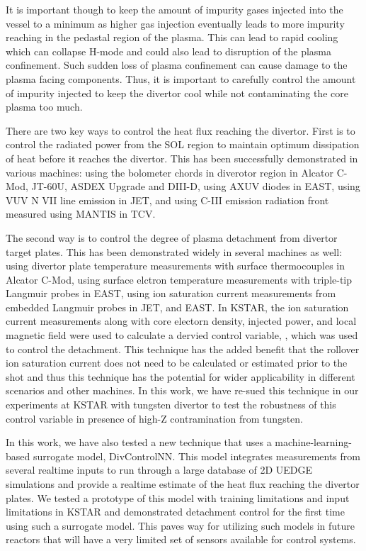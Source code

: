It is important though to keep the amount of impurity gases injected into the vessel to a minimum as higher gas injection eventually leads to more impurity reaching in the pedastal region of the plasma.
This can lead to rapid cooling which can collapse H-mode and could also lead to disruption of the plasma confinement.
Such sudden loss of plasma confinement can cause damage to the plasma facing components.
Thus, it is important to carefully control the amount of impurity injected to keep the divertor cool while not contaminating the core plasma too much.

There are two key ways to control the heat flux reaching the divertor.
First is to control the radiated power from the \ac{SOL} region to maintain optimum dissipation of heat before it reaches the divertor.
This has been successfully demonstrated in various machines:
using the bolometer chords in diverotor region in Alcator C-Mod\cite{Goetz_1999_POP}, JT-60U\cite{Asakura_2009_NF}, ASDEX Upgrade\cite{Kallenbach_2012_NF} and DIII-D\cite{Eldon_2019_NME},
using AXUV diodes in EAST\cite{Wu_2018_NF},
using VUV N VII line emission in JET\cite{Maddison_2011_NF}, and
using C-III emission radiation front measured using MANTIS in TCV\cite{Ravensbergen_2021_NC}.

The second way is to control the degree of plasma detachment from divertor target plates.
This has been demonstrated widely in several machines as well:
using divertor plate temperature measurements with surface thermocouples in Alcator C-Mod\cite{Brunner_2017_NF},
using surface elctron temperature measurements with triple-tip Langmuir probes in EAST\cite{Eldon_2021_NME},
using ion saturation current measurements from embedded Langmuir probes in JET\cite{Guillemaut_2017_PPCF}, and EAST\cite{Yuan_2020_FED}.
In KSTAR, the ion saturation current measurements along with core electorn density, injected power, and local magnetic field were used to calculate a dervied control variable, \Afrac, which was used to control the detachment\cite{Eldon_2022_PPCF}.
This technique has the added benefit that the rollover ion saturation current does not need to be calculated or estimated prior to the shot and thus this technique has the potential for wider applicability in different scenarios and other machines.
In this work, we have re-sued this technique in our experiments at KSTAR with tungsten divertor to test the robustness of this control variable in presence of high-Z contramination from tungsten.

In this work, we have also tested a new technique that uses a machine-learning-based surrogate model, DivControlNN\cite{Zhu_2025_InPrep}.
This model integrates measurements from several realtime inputs to run through a large database of 2D UEDGE simulations and provide a realtime estimate of the heat flux reaching the divertor plates.
We tested a prototype of this model with training limitations and input limitations in KSTAR and demonstrated detachment control for the first time using such a surrogate model.
This paves way for utilizing such models in future reactors that will have a very limited set of sensors available for control systems.

